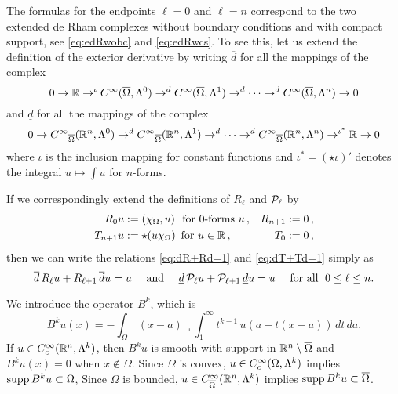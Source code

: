 \documentclass[10pt,a4paper]{article}
\begin{document}
The formulas for the endpoints $\ell=0$ and $\ell=n$ correspond to the two extended de Rham complexes without boundary conditions and with compact support, see \eqref{eq:edRwobc} and \eqref{eq:edRwcs}. To see this, let us extend the definition of the exterior derivative by writing $\overline d$ for all the mappings of the complex
$$
 0 \to{\mathbb R}\to^\iota{C^\infty}(\overline\Omega,\Lambda^0) \to^d {C^\infty}(\overline\Omega,\Lambda^1)
 \to^d\cdots \to^d {C^\infty}(\overline\Omega,\Lambda^n) \to 0
$$ 
and $\underline d$ for all the mappings of the complex
$$
 0 \to {C^\infty}_{\overline\Omega}({\mathbb R}^n,\Lambda^0) \to^d {C^\infty}_{\overline\Omega}({\mathbb R}^n,\Lambda^1) \to^d\cdots
 \to^d {C^\infty}_{\overline\Omega}({\mathbb R}^n,\Lambda^n) \to^{\iota^*} {\mathbb R} \to 0
$$
where $\iota$ is the inclusion mapping for constant functions and 
$\iota^*=(\star\iota)'$ denotes the integral $u\mapsto\int\!u$ for $n$-forms.

If we correspondingly extend the definitions of $R_{\ell}$ and ${\mathcal P}_{\ell}$ by
$$
\begin{aligned}
  R_0u &:=\left(\chi_{\Omega},u\right)\,\text{ for $0$-forms }u\,, &
  R_{n+1} &:=0\,,\\
  T_{n+1}u &:= \star(u\chi_{\Omega}) \,\text{ for }u\in{\mathbb R}\,,  &
  T_0 &:= 0\,,
\end{aligned}
$$
then we can write the relations \eqref{eq:dR+Rd=1} and \eqref{eq:dT+Td=1} simply as
\begin{equation}\label{eq:R&T&d}
 \overline d\,R_{\ell} u + R_{\ell+1} \,\overline d u  = u
 \quad \text{ and }\quad
 \underline d\,{\mathcal P}_{\ell} u + {\mathcal P}_{\ell+1} \,\underline du = u\quad \text{ for all }\;
  0\le\ell\le n.
\end{equation}

 
 
 


We introduce the operator $B^{k}$, which is
\begin{equation}\label{eq:Bogo} %
    B^{k} u(x) = - \int_{\Omega} \,(x-a) \lrcorner \int_1^\infty t^{{k}-1}\,u\left( a+t(x-a) \right) \,dt\,da.
\end{equation}
If $u \in C^{\infty}_{c}({\mathbb R}^{n},\Lambda^{k})$, 
then $B^{k} u$ is smooth with support in ${\mathbb R}^{n}\setminus\overline\Omega$ and $B^{k} u(x) = 0$ when $x \notin \Omega$. 
Since $\Omega$ is convex, $u \in C^{\infty}_{c}(\Omega,\Lambda^{k})$ implies $\operatorname{supp} B^{k} u \subset\Omega$, 
Since $\Omega$ is bounded, $u \in C^{\infty}_{\overline\Omega}({\mathbb R}^{n},\Lambda^{k})$ implies $\operatorname{supp} B^{k} u \subset\overline\Omega$. 
\end{document}
